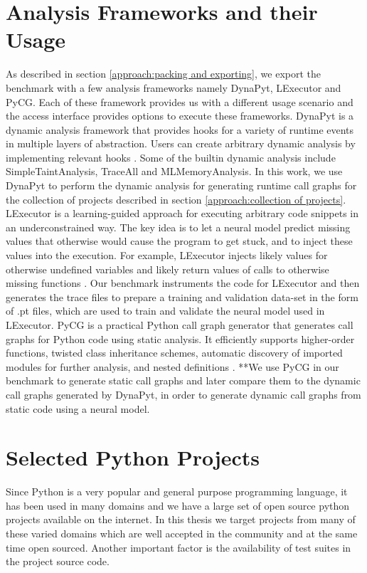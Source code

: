 \section{Analysis Frameworks and their Usage}
\label{approach:analysis framework}
As described in section \ref{approach:packing and exporting}, we export the benchmark with a few analysis frameworks namely DynaPyt, LExecutor and PyCG. Each of these framework provides us with a different usage scenario and the access interface provides options to execute these frameworks. DynaPyt is a dynamic analysis framework that provides hooks for a variety of runtime events in multiple layers of abstraction. Users can create arbitrary dynamic analysis by implementing relevant hooks \cite{DynaPyt2022}. Some of the builtin dynamic analysis include SimpleTaintAnalysis, TraceAll and MLMemoryAnalysis. In this work, we use DynaPyt to perform the dynamic analysis for generating runtime call graphs for the collection of projects described in section \ref{approach:collection of projects}. LExecutor is a learning-guided approach for executing arbitrary code snippets in an underconstrained way. The key idea is to let a neural model predict missing values that otherwise would cause the program to get stuck, and to inject these values into the execution. For example, LExecutor injects likely values for otherwise undefined variables and likely return values of calls to otherwise missing functions \cite{LExecutor_2023}. Our benchmark instruments the code for LExecutor and then generates the trace files to prepare a training and validation data-set in the form of .pt files, which are used to train and validate the neural model used in LExecutor. PyCG is a practical Python call graph generator that generates call graphs for Python code using static analysis. It efficiently supports higher-order functions, twisted class inheritance schemes, automatic discovery of imported modules for further analysis, and nested definitions \cite{PyCG_2021}. **We use PyCG in our benchmark to generate static call graphs and later compare them to the dynamic call graphs generated by DynaPyt, in order to generate dynamic call graphs from static code using a neural model.

\section{Selected Python Projects}
\label{approach:selection of projects}
Since Python is a very popular and general purpose programming language, it has been used in many domains and we have a large set of open source python projects available on the internet. In this thesis we target projects from many of these varied domains which are well accepted in the community and at the same time open sourced. Another important factor is the availability of test suites in the project source code. 

